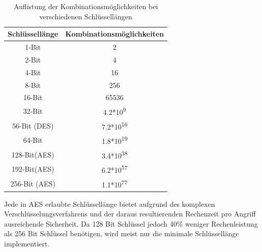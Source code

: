 \begin{table}[H] 
	\centering
	\begin{tabular}{|c|c|}\hline
		Schlüssellänge & Kombinationsmöglichkeiten\\ \hline \hline
		1-Bit & 2 \\ \hline
		2-Bit & 4 \\ \hline
		4-Bit & 16 \\ \hline
		8-Bit & 256 \\ \hline
		16-Bit & 65536 \\ \hline
		32-Bit & 4.2*10\textsuperscript{9} \\ \hline
		56-Bit (DES) & 7.2*10\textsuperscript{16} \\ \hline
		64-Bit  & 1.8*10\textsuperscript{19} \\ \hline
		128-Bit(AES) & 3.4*10\textsuperscript{38} \\ \hline
		192-Bit(AES) & 6.2*10\textsuperscript{57} \\ \hline
		256-Bit (AES) &  1.1*10\textsuperscript{77} \\ \hline
	\end{tabular}
	\caption{Auflistung der Kombinationsmöglichkeiten bei verschiedenen Schlüssellängen}
	\label{t:keylength}
\end{table}
\vspace{5 mm}

Jede in \ac{AES} erlaubte Schlüssellänge bietet aufgrund des komplexen Verschlüsselungsverfahrens und der daraus resultierenden Rechenzeit pro Angriff ausreichende Sicherheit. Da 128 Bit Schlüssel jedoch 40\% weniger Rechenleistung als 256 Bit Schlüssel benötigen, wird meist nur die minimale Schlüssellänge implementiert. 



